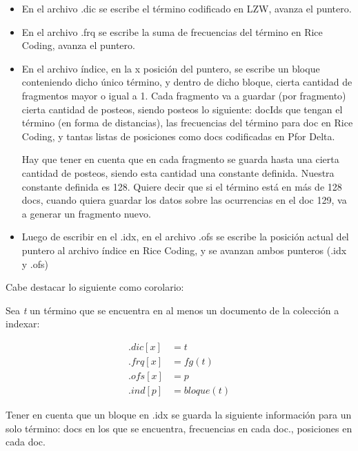 \begin {itemize}
\item En el archivo .dic se escribe el término codificado en LZW, avanza el puntero.

\item En el archivo .frq se escribe la suma de frecuencias del término en Rice Coding, avanza el puntero.

\item En el archivo índice, en la x posición del puntero, se escribe un bloque conteniendo dicho único término, y dentro de dicho bloque, cierta cantidad de fragmentos mayor o igual a 1. Cada fragmento va a guardar (por fragmento) cierta cantidad de posteos, siendo posteos lo siguiente: docIds que tengan el término (en forma de distancias), las frecuencias del término para doc en Rice Coding, y tantas listas de posiciones como docs codificadas en Pfor Delta. 

Hay que tener en cuenta que en cada fragmento se guarda hasta una cierta cantidad de posteos, siendo esta cantidad una constante definida. Nuestra constante definida es 128. Quiere decir que si el término está en más de 128 docs, cuando quiera guardar los datos sobre las ocurrencias en el doc 129, va a generar un fragmento nuevo. 

\item Luego de escribir en el .idx, en el archivo .ofs se escribe la posición actual del puntero al archivo índice en Rice Coding, y se avanzan ambos punteros (.idx y .ofs)

\end {itemize}
Cabe destacar lo siguiente como corolario:

Sea {\it t} un término que se encuentra en al menos un documento de la colección a indexar:

\begin {equation}
	\begin {aligned}
	.dic[x]&= t \\
	.frq[x]&= fg(t) \\
	.ofs[x]&= p \\
	.ind[p]&= bloque(t)
	\end {aligned}
\end {equation}

Tener en cuenta que un bloque en .idx se guarda la siguiente información para un solo término: docs en los que se encuentra, frecuencias en cada doc., posiciones en cada doc.


